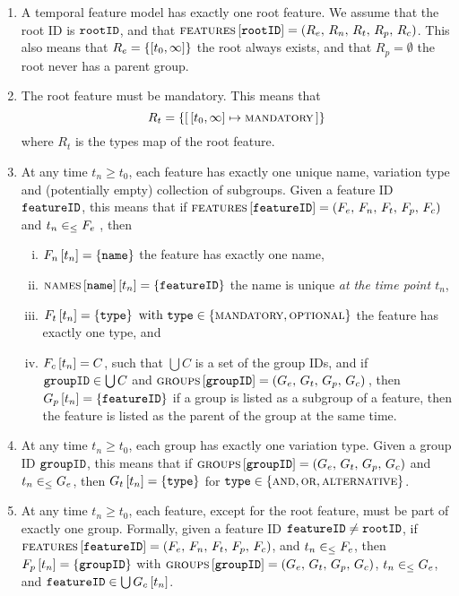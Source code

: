\begin{enumerate}[\itbf{TFMWF\arabic*}, itemsep=0mm]
   \item A temporal feature model has exactly one root feature. We assume that the root ID is $\texttt{rootID}$, and that $\textsc{features} \left[ \texttt{rootID} \right] = \left(R_e,\, R_n,\, R_t,\, R_p,\, R_c\right)$. This also means that $R_e=\set{\interval{t_0}{\forever}}$ \textemdash{} the root always exists, and that $R_p = \emptyset$ \textemdash{} the root never has a parent group.
\item The root feature must be mandatory. This means that $$R_t  = \set{\intervalmapping{t_0}{\forever}{\mandatory}}$$ where $R_t$ is the types map of the root feature. 
\item At any time $t_n \geq t_0$, each feature has exactly one unique name, variation type and (potentially empty) collection of subgroups. Given a feature ID $\texttt{featureID}$, this means that if $\textsc{features} \left[ \texttt{featureID} \right] = \left(F_e,\, F_n,\, F_t,\, F_p,\, F_c\right)$ and $t_n \in_\leq F_e$ , then
   \begin{enumerate}[(i)]
      \item $F_n \left[ t_n \right] = \left\{\texttt{name}\right\}$ \textemdash{} the feature has exactly one name,
      \item $\textsc{names} \left[ \texttt{name} \right] \left[ t_n \right] = \left\{\texttt{featureID}\right\}$ \textemdash{} the name is unique \emph{at the time point $t_n$},
      \item $F_t \left[ t_n \right] = \left\{\texttt{type}\right\} \text{ with } \texttt{type} \in \left\{\textsc{mandatory}, \textsc{optional}\right\}$ \textemdash{} the feature has exactly one type, and
      \item $F_c \left[ t_n \right] = C$, such that $\bigcup C$ is a set of the group IDs, and if $\texttt{groupID} \in \bigcup C$ and $\textsc{groups}{} \left[ \texttt{groupID} \right] = \left(G_e,\, G_t,\, G_p,\, G_c\right){}$, then $G_p \left[ t_n \right] = \left\{\texttt{featureID}\right\}$ \textemdash{} if a group is listed as a subgroup of a feature, then the feature is listed as the parent of the group at the same time.
   \end{enumerate}
   \item At any time $t_n \geq t_0$, each group has exactly one variation type. Given a group ID $\texttt{groupID}$, this means that if $\textsc{groups}{} \left[ \texttt{groupID} \right] = \left(G_e,\, G_t,\, G_p,\, G_c\right)$ and $t_n \in_\leq G_e$, then $G_t \left[ t_n \right] = \left\{\texttt{type}\right\}$ for $\texttt{type} \in \left\{\textsc{and}, \textsc{or}, \textsc{alternative}\right\}$.
   \item At any time $t_n \geq t_0$, each feature, except for the root feature, must be part of exactly one group. Formally, given a feature ID $\texttt{featureID} \neq \texttt{rootID}$, if $\textsc{features} \left[ \texttt{featureID} \right] = \left(F_e,\, F_n,\, F_t,\, F_p,\, F_c\right)$, and $t_n \in_\leq F_e$, then $F_p \left[ t_n \right] = \left\{\texttt{groupID}\right\}$ with $\textsc{groups}{} \left[ \texttt{groupID} \right] = \left(G_e,\, G_t,\, G_p,\, G_c\right)$, $t_n \in_\leq G_e$, and $\texttt{featureID} \in \bigcup G_c \left[ t_n \right]$. 

\end{enumerate}
